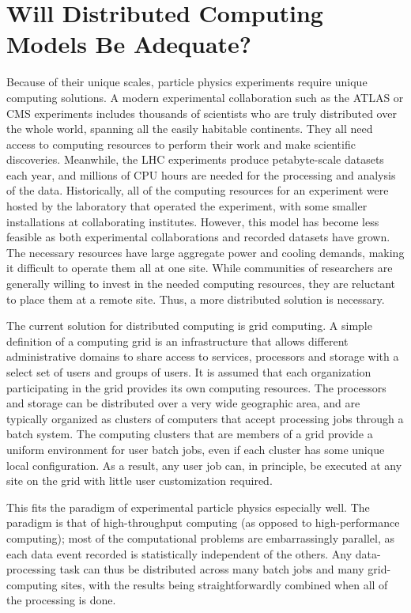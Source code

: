 \section{Will Distributed Computing Models Be Adequate?}
\label{sec:grid}
Because of their unique scales, particle physics experiments require unique computing solutions.  A modern experimental collaboration such as the ATLAS or CMS experiments includes thousands of scientists who are truly distributed over the whole world, spanning all the easily habitable continents.  They all need access to computing resources to perform their work and make scientific discoveries.  Meanwhile, the LHC experiments produce petabyte-scale datasets each year, and millions of CPU hours are needed for the processing and analysis of the data.  Historically, all of the computing resources for an experiment were hosted by the laboratory that operated the experiment, with some smaller installations at collaborating institutes.  However, this model has become less feasible as both experimental collaborations and recorded datasets have grown.  The necessary resources have large aggregate power and cooling demands, making it difficult to operate them all at one site.  While communities of researchers are generally willing to invest in the needed computing resources, they are reluctant to place them at a remote site.  Thus, a more distributed solution is necessary.

The current solution for distributed computing is grid computing.  A simple definition of a computing grid is an infrastructure that allows different administrative domains to share access to services, processors and storage with a select set of users and groups of users.  It is assumed that each organization participating in the grid provides its own computing resources.  The processors and storage can be distributed over a very wide geographic area, and are typically organized as clusters of computers that accept processing jobs through a batch system.  The computing clusters that are members of a grid provide a uniform environment for user batch jobs, even if each cluster has some unique local configuration.  As a result, any user job can, in principle, be executed at any site on the grid with little user customization required.

This fits the paradigm of experimental particle physics especially well.  The paradigm is that of high-throughput computing (as opposed to high-performance computing); most of the computational problems are embarrassingly parallel, as each data event recorded is statistically independent of the others.  Any data-processing task can thus be distributed across many batch jobs and many grid-computing sites, with the results being straightforwardly combined when all of the processing is done.


